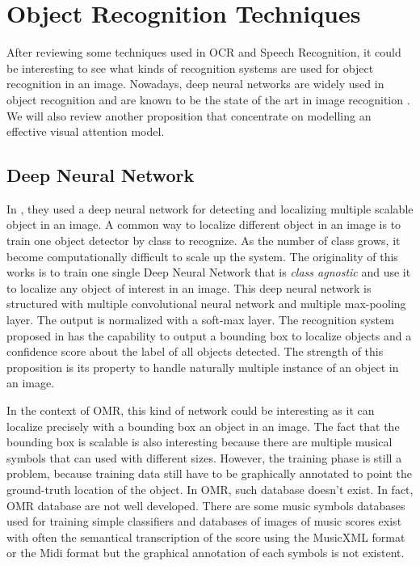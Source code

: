 \documentclass[11pt]{sdm}
\begin{document}
\section{Object Recognition Techniques}

After reviewing some techniques used in OCR and Speech Recognition, it could be interesting to see what kinds of recognition systems are used for object recognition in an image.
Nowadays, deep neural networks are widely used in object recognition and are known to be the state of the art in image recognition \cite{erhan_scalable_2014}.
We will also review another proposition \cite{ba_multiple_2014} that concentrate on modelling an effective visual attention model.

\subsection{Deep Neural Network}

In \cite{erhan_scalable_2014}, they used a deep neural network for detecting and localizing multiple scalable object in an image.
A common way to localize different object in an image is to train one object detector by class to recognize.
As the number of class grows, it become computationally difficult to scale up the system.
The originality of this works is to train one single Deep Neural Network that is \textit{class agnostic} and use it to localize any object of interest in an image.
This deep neural network is structured with multiple convolutional neural network and multiple max-pooling layer.
The output is normalized with a soft-max layer.
The recognition system proposed in \cite{erhan_scalable_2014} has the capability to output a bounding box to localize objects and a confidence score about the label of all objects detected.
The strength of this proposition is its property to handle naturally multiple instance of an object in an image.

In the context of OMR, this kind of network could be interesting as it can localize precisely with a bounding box an object in an image.
The fact that the bounding box is scalable is also interesting because there are multiple musical symbols that can used with different sizes.
However, the training phase is still a problem, because training data still have to be graphically annotated to point the ground-truth location of the object.
In OMR, such database doesn't exist.
In fact, OMR database are not well developed.
There are some music symbols databases used for training simple classifiers and databases of images of music scores exist with often the semantical transcription of the score using the MusicXML format or the Midi format but the graphical annotation of each symbols is not existent.
\end{document}
